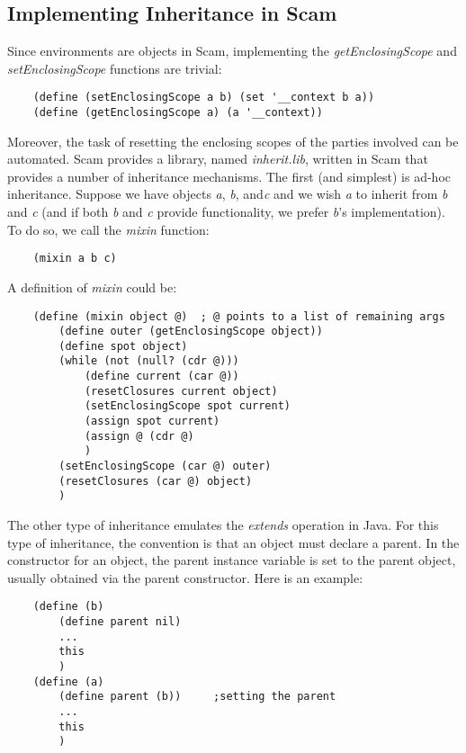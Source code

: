 {{\subsection{Implementing Inheritance in Scam}

Since environments are objects in Scam, implementing the {\it
getEnclosingScope} and {\it setEnclosingScope} functions are trivial:

\begin{verbatim}
    (define (setEnclosingScope a b) (set '__context b a))
    (define (getEnclosingScope a) (a '__context))
\end{verbatim}

Moreover, the task of resetting the enclosing scopes of the parties
involved can be automated. Scam provides a library, 
named {\it inherit.lib}, written in Scam that
provides a number of inheritance mechanisms. The first (and simplest)
is ad-hoc inheritance. Suppose we have objects {\it a}, {\it b}, and{\it  c}
and we wish
{\it a} to inherit from {\it b} and {\it c}
(and if both {\it b} and {\it c} provide functionality,
we prefer {\it b}'s implementation).
To do so, we call the {\it mixin} function:

\begin{verbatim}
    (mixin a b c)
\end{verbatim}

A definition of {\it mixin} could be:

\begin{verbatim}
    (define (mixin object @)  ; @ points to a list of remaining args
        (define outer (getEnclosingScope object))
        (define spot object)
        (while (not (null? (cdr @)))
            (define current (car @))
            (resetClosures current object)
            (setEnclosingScope spot current)
            (assign spot current)
            (assign @ (cdr @)
            )
        (setEnclosingScope (car @) outer)
        (resetClosures (car @) object)
        )
\end{verbatim}

The other type of inheritance emulates the {\it extends} operation in
Java.  For this type of inheritance, the convention is that an object
must declare a parent. In the constructor for an object, the parent
instance variable is set to the parent object, usually obtained via the
parent constructor.  Here is an example:

\begin{verbatim}
    (define (b)
        (define parent nil)
        ...
        this
        )
    (define (a)
        (define parent (b))     ;setting the parent 
        ...
        this
        )
\end{verbatim}

}}
